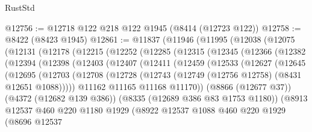 \begin{lexlean}{RustStd}
\begin{coremodule}
@12756 := @12718 @122 @218 @122 @1945 (@8414 (@12723 @122))
@12758 := @8422 (@8423 @1945)
@12861 := @11837
    (@11946
      (@11995
        (@12038
          (@12075
            (@12131
              (@12178
                (@12215
                  (@12252
                    (@12285
                      (@12315
                        (@12345
                          (@12366
                            (@12382
                              (@12394
                                (@12398
                                  (@12403
                                    (@12407
                                      (@12411
                                        (@12459
                                          (@12533
                                            (@12627
                                              (@12645
                                                (@12695
                                                  (@12703
                                                    (@12708
                                                      (@12728
                                                        (@12743
                                                          (@12749
                                                            (@12756 @12758)
                                                            (@8431 @12651 @1088)))))
                                                    @11162
                                                    @11165
                                                    @11168
                                                    @11170))
                                                (@8866 (@12677 @37))
                                                (@4372 (@12682 @139 @386))
                                                (@8335 (@12689 @386 @83 @1753 @1180))
                                                (@8913
                                                  @12537
                                                  @460
                                                  @220
                                                  @1180
                                                  @1929
                                                  (@8922
                                                    @12537
                                                    @1088
                                                    @460
                                                    @220
                                                    @1929
                                                    (@8696
                                                      @12537

\end{coremodule}
\end{lexlean}
